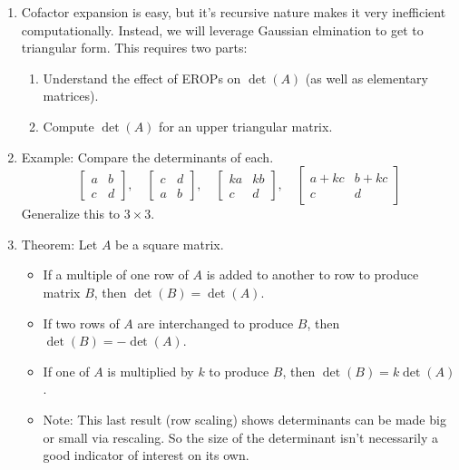 \documentclass{article}
\begin{document}
\begin{enumerate}

\item Cofactor expansion is easy, but it's recursive nature makes it very inefficient computationally. Instead, we will leverage Gaussian elmination to get to triangular form. This requires two parts:
\begin{enumerate}
\item Understand the effect of EROPs on $\det(A)$ (as well as elementary matrices).
\item Compute $\det(A)$ for an upper triangular matrix.
\end{enumerate}

\item Example: Compare the determinants of each.
\[
\left[
\begin{array}{cc}
a & b \\
c & d
\end{array}
\right], \quad 
\left[
\begin{array}{cc}
c & d \\
a & b 
\end{array}
\right], \quad 
\left[
\begin{array}{cc}
ka & kb \\
c & d
\end{array}
\right], \quad 
\left[
\begin{array}{cc}
a+kc & b+kc \\
c & d
\end{array}
\right]
\]
Generalize this to $3 \times 3$.

\item Theorem: Let $A$ be a square matrix. 
\begin{itemize}
\item If a multiple of one row of $A$ is added to another to row to produce matrix $B$, then $\det(B)=\det(A)$.
\item If two rows of $A$ are interchanged to produce $B$, then $\det(B)=-\det(A)$.
\item If one of $A$ is multiplied by $k$ to produce $B$, then $\det(B)=k\det(A)$.
\item Note: This last result (row scaling) shows determinants can be made big or small via rescaling. So the size of the determinant isn't necessarily a good indicator of interest on its own.
\end{itemize}


\end{enumerate}
\end{document}
